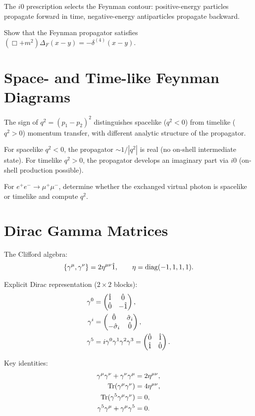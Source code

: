 The $i0$ prescription selects the Feynman contour: positive-energy
particles propagate forward in time, negative-energy antiparticles
propagate backward.

\begin{exercise}
Show that the Feynman propagator satisfies
$(\Box+m^2)\Delta_F(x-y)=-\delta^{(4)}(x-y)$.
\end{exercise}

\section{Space- and Time-like Feynman Diagrams}

The sign of $q^2=(p_1-p_2)^2$ distinguishes
spacelike ($q^2<0$) from timelike ($q^2>0$) momentum transfer,
with different analytic structure of the propagator.

For spacelike $q^2<0$, the propagator $\sim 1/|q^2|$ is real (no on-shell
intermediate state). For timelike $q^2>0$, the propagator develops an
imaginary part via $i0$ (on-shell production possible).

\begin{exercise}
For $e^+e^-\to\mu^+\mu^-$, determine whether the exchanged virtual
photon is spacelike or timelike and compute $q^2$.
\end{exercise}

\section{Dirac Gamma Matrices}

The Clifford algebra:
\begin{equation}
\{\gamma^\mu,\gamma^\nu\} = 2\eta^{\mu\nu}\hat 1,
\qquad \eta={\rm diag}(-1,1,1,1).
\label{eq:10.6.1}
\end{equation}

Explicit Dirac representation ($2\times2$ blocks):
\begin{align}
\gamma^0 &= \begin{pmatrix}\hat 1&\hat 0\\\hat 0&-\hat 1\end{pmatrix},\\
\gamma^i &= \begin{pmatrix}\hat 0&\hat\sigma_i\\-\hat\sigma_i&\hat 0\end{pmatrix},\\
\gamma^5 &= i\gamma^0\gamma^1\gamma^2\gamma^3
= \begin{pmatrix}\hat 0&\hat 1\\\hat 1&\hat 0\end{pmatrix}.
\label{eq:10.6.2}
\end{align}

Key identities:
\begin{align}
\gamma^\mu\gamma^\nu+\gamma^\nu\gamma^\mu &= 2\eta^{\mu\nu},\\
\operatorname{Tr}(\gamma^\mu\gamma^\nu) &= 4\eta^{\mu\nu},\\
\operatorname{Tr}(\gamma^5\gamma^\mu\gamma^\nu) &= 0,\\
\gamma^5\gamma^\mu+\gamma^\mu\gamma^5 &= 0.
\label{eq:10.6.3}
\end{align}


